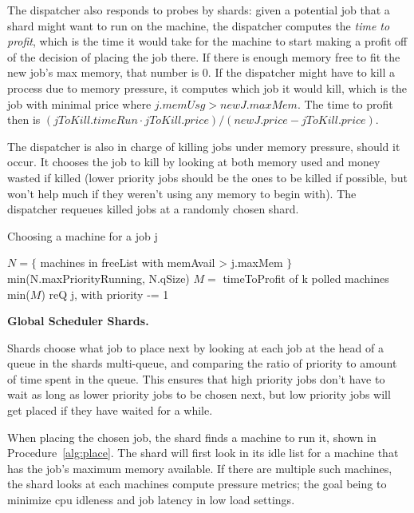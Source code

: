 The dispatcher also responds to probes by shards: given a potential job that a
shard might want to run on the machine, the dispatcher computes the \textit{time
to profit}, which is the time it would take for the machine to start making a
profit off of the decision of placing the job there. If there is enough memory
free to fit the new job's max memory, that number is 0. If the dispatcher might
have to kill a process due to memory pressure, it computes which job it would
kill, which is the job with minimal price where $j.memUsg > newJ.maxMem$. The
time to profit then is $(jToKill.timeRun \cdot jToKill.price) / (newJ.price
- jToKill.price)$.

The dispatcher is also in charge of killing jobs under memory pressure, should
it occur. It chooses the job to kill by looking at both memory used and money
wasted if killed (lower priority jobs should be the ones to be killed if
possible, but won't help much if they weren't using any memory to begin with).
The dispatcher requeues killed jobs at a randomly chosen shard.

\makeatletter
\renewcommand{\ALG@name}{Procedure}
\makeatother
\begin{algorithm}[t]
\caption{Choosing a machine for a job j}\label{alg:place}
\begin{algorithmic}
    \State$N = \{ $ machines in freeList with memAvail > j.maxMem $\}$
     \\
        \Return$ $min(N.maxPriorityRunning, N.qSize)
    \EndIf
    \State$M = $ timeToProfit of k polled machines
     \\
        \Return$ $min($M$)
    \Else
        \State$ $reQ j, with priority -= 1
    \EndIf
\end{algorithmic}
\end{algorithm}


\textbf{Global Scheduler Shards.}

Shards choose what job to place next by looking at each job at the head of a
queue in the shards multi-queue, and comparing the ratio of priority to amount
of time spent in the queue. This ensures that high priority jobs don't have to
wait as long as lower priority jobs to be chosen next, but low priority jobs
will get placed if they have waited for a while.

When placing the chosen job, the shard finds a machine to run it, shown in
Procedure~\ref{alg:place}. The shard will first look in its idle list for a
machine that has the job's maximum memory available. If there are multiple such
machines, the shard looks at each machines compute pressure metrics; the goal
being to minimize cpu idleness and job latency in low load
settings. 

